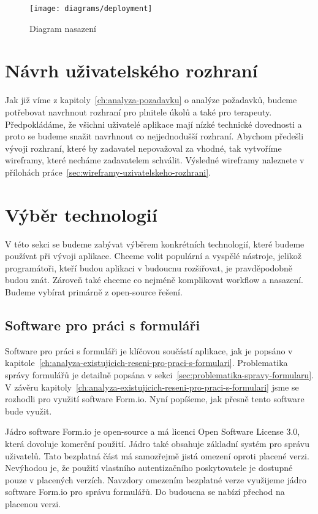 \begin{figure}[H]
    \centering
    \texttt{[image: diagrams/deployment]}
    \caption{Diagram nasazení}\label{fig:deployment}
\end{figure}


\section{Návrh uživatelského rozhraní}\label{sec:navrh-uzivatelskeho-rozhrani}

Jak již víme z kapitoly~\ref{ch:analyza-pozadavku} o analýze požadavků, budeme potřebovat navrhnout rozhraní pro plnitele úkolů a také pro terapeuty.
Předpokládáme, že všichni uživatelé aplikace mají nízké technické dovednosti a proto se budeme snažit navrhnout co nejjednodušší rozhraní.
Abychom předešli vývoji rozhraní, které by zadavatel nepovažoval za vhodné, tak vytvoříme wireframy, které necháme zadavatelem schválit.
Výsledné wireframy naleznete v přílohách práce~\ref{sec:wireframy-uzivatelskeho-rozhrani}.


\section{Výběr technologií}\label{sec:vyber-technologii}

V této sekci se budeme zabývat výběrem konkrétních technologií, které budeme používat při vývoji aplikace.
Chceme volit populární a vyspělé nástroje, jelikož programátoři, kteří budou aplikaci v budoucnu rozšiřovat, je pravděpodobně budou znát.
Zároveň také chceme co nejméně komplikovat workflow a nasazení.
Budeme vybírat primárně z open-source řešení.

\subsection{Software pro práci s formuláři}\label{subsec:software-pro-praci-s-formulari}

Software pro práci s formuláři je klíčovou součástí aplikace, jak je popsáno v kapitole~\ref{ch:analyza-existujicich-reseni-pro-praci-s-formulari}.
Problematika správy formulářů je detailně popsána v sekci~\ref{sec:problematika-spravy-formularu}.
V závěru kapitoly~\ref{ch:analyza-existujicich-reseni-pro-praci-s-formulari} jsme se rozhodli pro využití software Form.io.
Nyní popíšeme, jak přesně tento software bude využit.

Jádro software Form.io je open-source a má licenci Open Software License 3.0, která dovoluje komerční použití.
Jádro také obsahuje základní systém pro správu uživatelů.
Tato bezplatná část má samozřejmě jistá omezení oproti placené verzi.
Nevýhodou je, že použití vlastního autentizačního poskytovatele je dostupné pouze v placených verzích.
Navzdory omezením bezplatné verze využijeme jádro software Form.io pro správu formulářů.
Do budoucna se nabízí přechod na placenou verzi.

